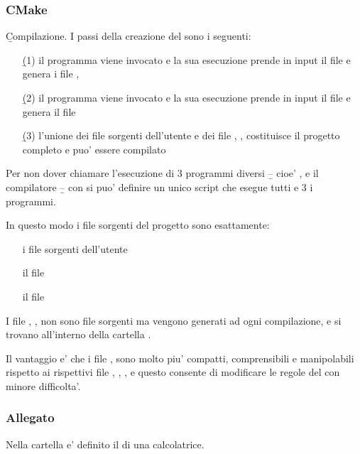 \subsubsection{CMake}

\b{Compilazione}. I passi della creazione del  sono i seguenti:
\begin{itemize}
\item[\b{(1)}] il programma  viene invocato e la sua esecuzione prende in input il file  e genera i file , 
\item[\b{(2)}] il programma  viene invocato e la sua esecuzione prende in input il file  e genera il file 
\item[\b{(3)}] l'unione dei file sorgenti  dell'utente e dei file , ,  costituisce il progetto  completo e puo' essere compilato
\end{itemize}

Per non dover chiamare l'esecuzione di 3 programmi diversi \b{--} cioe' ,  e il compilatore  \b{--} con  si puo' definire un unico script che esegue tutti e 3 i programmi.

\skipline

In questo modo i file sorgenti del progetto sono esattamente:
\begin{itemize}
\item[\bbox] i file sorgenti  dell'utente
\item[\bbox] il file 
\item[\bbox] il file 
\end{itemize}

I file , ,  non sono file sorgenti ma vengono generati ad ogni compilazione, e si trovano all'interno della cartella .

\skipline

Il vantaggio e' che i file ,  sono molto piu' compatti, comprensibili e manipolabili rispetto ai rispettivi file , , , e questo consente di modificare le regole del  con minore difficolta'.

\subsubsection{Allegato}

Nella cartella  e' definito il  di una calcolatrice.


